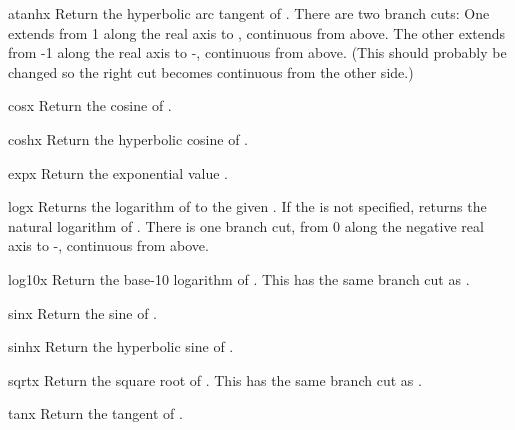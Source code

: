 \begin{funcdesc}{atanh}{x}
Return the hyperbolic arc tangent of .
There are two branch cuts:
One extends from 1 along the real axis to \infinity, continuous
from above.
The other extends from -1 along the real axis to -\infinity,
continuous from above.
(This should probably be changed so the right cut becomes continuous from
the other side.)
\end{funcdesc}

\begin{funcdesc}{cos}{x}
Return the cosine of .
\end{funcdesc}

\begin{funcdesc}{cosh}{x}
Return the hyperbolic cosine of .
\end{funcdesc}

\begin{funcdesc}{exp}{x}
Return the exponential value .
\end{funcdesc}

\begin{funcdesc}{log}{x}
Returns the logarithm of  to the given .
If the  is not specified, returns the natural logarithm of .
There is one branch cut, from 0 along the negative real axis to
-\infinity, continuous from above.
\end{funcdesc}

\begin{funcdesc}{log10}{x}
Return the base-10 logarithm of .
This has the same branch cut as .
\end{funcdesc}

\begin{funcdesc}{sin}{x}
Return the sine of .
\end{funcdesc}

\begin{funcdesc}{sinh}{x}
Return the hyperbolic sine of .
\end{funcdesc}

\begin{funcdesc}{sqrt}{x}
Return the square root of .
This has the same branch cut as .
\end{funcdesc}

\begin{funcdesc}{tan}{x}
Return the tangent of .
\end{funcdesc}

